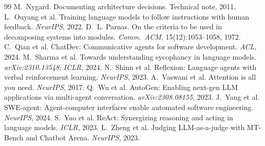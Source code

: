 \documentclass[11pt]{article}
\begin{document}
\begin{thebibliography}{99}
 M.~Nygard. Documenting architecture decisions. Technical note, 2011.
 L.~Ouyang et al. Training language models to follow instructions with human feedback. \emph{NeurIPS}, 2022.
 D.~L. Parnas. On the criteria to be used in decomposing systems into modules. \emph{Comm.\ ACM}, 15(12):1053--1058, 1972.
 C.~Qian et al. ChatDev: Communicative agents for software development. \emph{ACL}, 2024.
 M.~Sharma et al. Towards understanding sycophancy in language models. \emph{arXiv:2310.13548}; \emph{ICLR}, 2024.
 N.~Shinn et al. Reflexion: Language agents with verbal reinforcement learning. \emph{NeurIPS}, 2023.
 A.~Vaswani et al. Attention is all you need. \emph{NeurIPS}, 2017.
 Q.~Wu et al. AutoGen: Enabling next-gen LLM applications via multi-agent conversation. \emph{arXiv:2308.08155}, 2023.
 J.~Yang et al. SWE-agent: Agent-computer interfaces enable automated software engineering. \emph{NeurIPS}, 2024.
 S.~Yao et al. ReAct: Synergizing reasoning and acting in language models. \emph{ICLR}, 2023.
 L.~Zheng et al. Judging LLM-as-a-judge with MT-Bench and Chatbot Arena. \emph{NeurIPS}, 2023.
\end{thebibliography}
\end{document}
